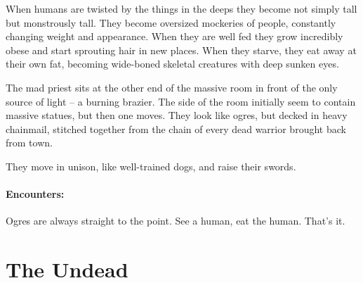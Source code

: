 \begin{multicols}{2}

\label{ogre}

When humans are twisted by the things in the deeps they become not simply tall but monstrously tall.
They become oversized mockeries of people, constantly changing weight and appearance.
When they are well fed they grow incredibly obese and start sprouting hair in new places.
When they starve, they eat away at their own fat, becoming wide-boned skeletal creatures with deep sunken eyes.


\begin{boxtext}

	The mad priest sits at the other end of the massive room in front of the only source of light -- a burning brazier.
	The side of the room initially seem to contain massive statues, but then one moves.
	They look like ogres, but decked in heavy chainmail, stitched together from the chain of every dead warrior brought back from town.

	They move in unison, like well-trained dogs, and raise their swords.

\end{boxtext}

\paragraph{Encounters:}

Ogres are always straight to the point.
See a human, eat the human.
That's it.

\end{multicols}

\section{The Undead}

